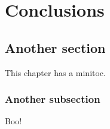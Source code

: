 \chapter{Conclusions} 
\label{ch: Conclusions}

\adjustmtc
\minitoc

\section{Another section}
This chapter has a minitoc. 

\subsection{Another subsection}
Boo!
